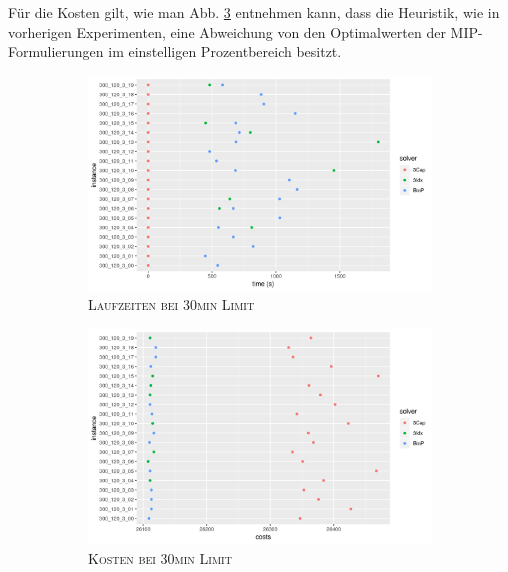 Für die Kosten gilt, wie man Abb. \ref{fig:b=3_m_costs} entnehmen kann, dass die Heuristik, wie in vorherigen Experimenten,
eine Abweichung von den Optimalwerten der MIP-Formulierungen im einstelligen Prozentbereich besitzt.

\begin{figure}[H]
\centering
\begin{subfigure}[b]{0.4\textwidth}
\centering
\includegraphics[width=1.3\textwidth]{img/solver_instance_time_b=3_m_1800s.png}
\caption{\textsc{Laufzeiten bei 30min Limit}}
\label{fig:b=3_m_runtimes}
\end{subfigure}
\hfill
\begin{subfigure}[b]{0.4\textwidth}
\centering
\includegraphics[width=1.3\textwidth]{img/solver_instance_cost_b=3_m_1800s.png}
\caption{\textsc{Kosten bei 30min Limit}}
\label{fig:b=3_m_costs}
\end{subfigure}
\caption{}
\end{figure}

